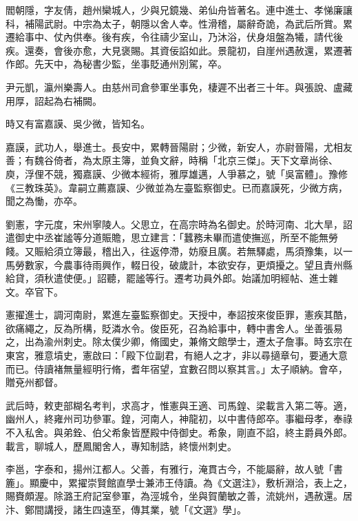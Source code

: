 \begin{pinyinscope}
 閻朝隱，字友倩，趙州欒城人，少與兄鏡幾、弟仙舟皆著名。連中進士、孝悌廉讓科，補陽武尉。中宗為太子，朝隱以舍人幸。性滑稽，屬辭奇詭，為武后所賞。累遷給事中、仗內供奉。後有疾，令往禱少室山，乃沐浴，伏身俎盤為犧，請代後疾。還奏，會後亦愈，大見褒賜。其資佞諂如此。景龍初，自崖州遇赦還，累遷著作郎。先天中，為秘書少監，坐事貶通州別駕，卒。



 尹元凱，瀛州樂壽人。由慈州司倉參軍坐事免，棲遲不出者三十年。與張說、盧藏用厚，詔起為右補闕。



 時又有富嘉謨、吳少微，皆知名。



 嘉謨，武功人，舉進士。長安中，累轉晉陽尉；少微，新安人，亦尉晉陽，尤相友善；有魏谷倚者，為太原主簿，並負文辭，時稱「北京三傑」。天下文章尚徐、庾，浮俚不競，獨嘉謨、少微本經術，雅厚雄邁，人爭慕之，號「吳富體」。豫修《三教珠英》。韋嗣立薦嘉謨、少微並為左臺監察御史。已而嘉謨死，少微方病，聞之為慟，亦卒。



 劉憲，字元度，宋州寧陵人。父思立，在高宗時為名御史。於時河南、北大旱，詔遣御史中丞崔謐等分道賑贍，思立建言：「蠶務未畢而遣使撫巡，所至不能無勞餞。又賑給須立簿最，稽出入，往返停滯，妨廢且廣。若無驛處，馬須豫集，以一馬勞數家，今農事待雨興作，輟日役，破歲計，本欲安存，更煩擾之。望且責州縣給貸，須秋遣使便。」詔聽，罷謐等行。遷考功員外郎。始議加明經帖、進士雜文。卒官下。



 憲擢進士，調河南尉，累進左臺監察御史。天授中，奉詔按來俊臣罪，憲疾其酷，欲痛繩之，反為所構，貶潾水令。俊臣死，召為給事中，轉中書舍人。坐善張易之，出為渝州刺史。除太僕少卿，脩國史，兼脩文館學士，遷太子詹事。時玄宗在東宮，雅意墳史，憲啟曰：「殿下位副君，有絕人之才，非以尋擿章句，要通大意而已。侍讀褚無量經明行脩，耆年宿望，宜數召問以察其言。」太子順納。會卒，贈兗州都督。



 武后時，敕吏部糊名考判，求高才，惟憲與王適、司馬鍠、梁載言入第二等。適，幽州人，終雍州司功參軍。鍠，河南人，神龍初，以中書侍郎卒。事繼母孝，奉祿不入私舍。與弟銓、伯父希象皆歷殿中侍御史。希象，剛直不諂，終主爵員外郎。載言，聊城人，歷鳳閣舍人，專知制誥，終懷州刺史。



 李邕，字泰和，揚州江都人。父善，有雅行，淹貫古今，不能屬辭，故人號「書簏」。顯慶中，累擢崇賢館直學士兼沛王侍讀。為《文選注》，敷析淵洽，表上之，賜賚頗渥。除潞王府記室參軍，為涇城令，坐與賀蘭敏之善，流姚州，遇赦還。居汴、鄭間講授，諸生四遠至，傳其業，號「《文選》學」。




\end{pinyinscope}
